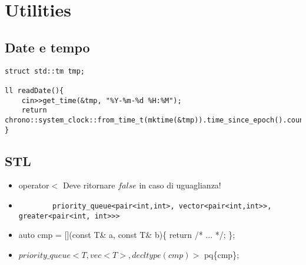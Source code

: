 \section{Utilities}

\subsection{Date e tempo}
\begin{lstlisting}
struct std::tm tmp;

ll readDate(){
	cin>>get_time(&tmp, "%Y-%m-%d %H:%M");
	return chrono::system_clock::from_time_t(mktime(&tmp)).time_since_epoch().count();
}
\end{lstlisting}

\subsection{STL}
\begin{itemize}
    \item operator$<$ Deve ritornare $false$ in caso di uguaglianza!
    \item \begin{lstlisting}
        priority_queue<pair<int,int>, vector<pair<int,int>>, greater<pair<int, int>>>
    \end{lstlisting}
    \item auto cmp = [](const T\& a, const T\& b)\{ return /* ... */; \};
    \item $priority\_queue<T,vec<T>,decltype(cmp)>$ pq\{cmp\};
\end{itemize}